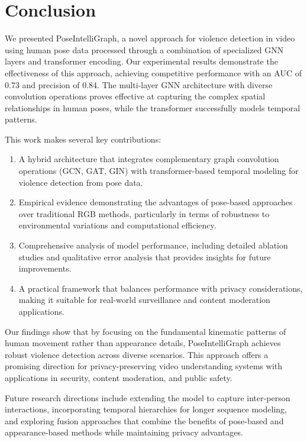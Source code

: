\documentclass[conference]{IEEEtran}
\begin{document}
\section{Conclusion}
We presented PoseIntelliGraph, a novel approach for violence detection in video
using human pose data processed through a combination of specialized GNN layers
and transformer encoding. Our experimental results demonstrate the
effectiveness of this approach, achieving competitive performance with an AUC
of 0.73 and precision of 0.84. The multi-layer GNN architecture with diverse
convolution operations proves effective at capturing the complex spatial
relationships in human poses, while the transformer successfully models
temporal patterns.

This work makes several key contributions:

\begin{enumerate}
    \item A hybrid architecture that integrates complementary graph convolution
          operations (GCN, GAT, GIN) with transformer-based temporal modeling for
          violence detection from pose data.

    \item Empirical evidence demonstrating the advantages of pose-based approaches over
          traditional RGB methods, particularly in terms of robustness to environmental
          variations and computational efficiency.

    \item Comprehensive analysis of model performance, including detailed ablation
          studies and qualitative error analysis that provides insights for future
          improvements.

    \item A practical framework that balances performance with privacy considerations,
          making it suitable for real-world surveillance and content moderation
          applications.
\end{enumerate}

Our findings show that by focusing on the fundamental kinematic patterns of
human movement rather than appearance details, PoseIntelliGraph achieves robust
violence detection across diverse scenarios. This approach offers a promising
direction for privacy-preserving video understanding systems with applications
in security, content moderation, and public safety.

Future research directions include extending the model to capture inter-person
interactions, incorporating temporal hierarchies for longer sequence modeling,
and exploring fusion approaches that combine the benefits of pose-based and
appearance-based methods while maintaining privacy advantages.



\end{document}
